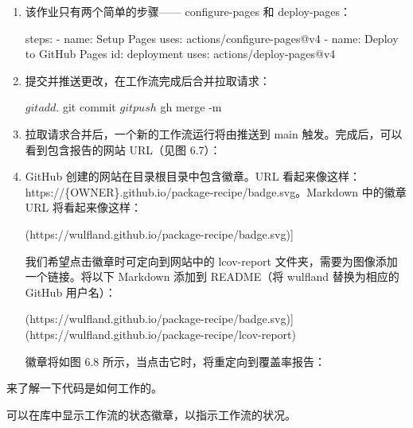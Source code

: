 \begin{enumerate}
\item 
该作业只有两个简单的步骤—— configure-pages 和 deploy-pages：

\begin{shell}
steps:
  - name: Setup Pages
    uses: actions/configure-pages@v4
  - name: Deploy to GitHub Pages
    id: deployment
    uses: actions/deploy-pages@v4
\end{shell}

\item 
提交并推送更改，在工作流完成后合并拉取请求：

\begin{shell}
$ git add .
$ git commit
$ git push
$ gh merge -m
\end{shell}

\item 
拉取请求合并后，一个新的工作流运行将由推送到 main 触发。完成后，可以看到包含报告的网站 URL（见图 6.7）：


\item 
GitHub 创建的网站在目录根目录中包含徽章。URL 看起来像这样：https://\{OWNER\}.github.io/package-recipe/badge.svg。Markdown 中的徽章 URL 将看起来像这样：

\begin{shell}
[![Coverage](https://wulfland.github.io/package-recipe/badge.svg)]
\end{shell}

我们希望点击徽章时可定向到网站中的 lcov-report 文件夹，需要为图像添加一个链接。将以下 Markdown 添加到 README（将 wulfland 替换为相应的 GitHub 用户名）：

\begin{shell}
[![Coverage](https://wulfland.github.io/package-recipe/badge.svg)] (https://wulfland.github.io/package-recipe/lcov-report)
\end{shell}

徽章将如图 6.8 所示，当点击它时，将重定向到覆盖率报告：

  
\end{enumerate}


来了解一下代码是如何工作的。


可以在库中显示工作流的状态徽章，以指示工作流的状况。


